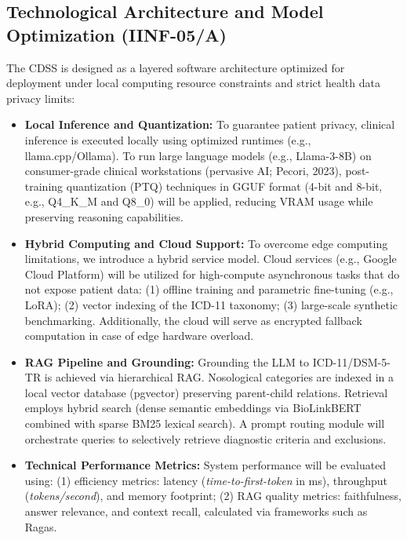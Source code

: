 \documentclass[11pt,a4paper]{article}
\begin{document}
\subsection{Technological Architecture and Model Optimization (IINF-05/A)}
The CDSS is designed as a layered software architecture optimized for deployment under local computing resource constraints and strict health data privacy limits:
\begin{itemize}
    \item \textbf{Local Inference and Quantization:} To guarantee patient privacy, clinical inference is executed locally using optimized runtimes (e.g., llama.cpp/Ollama). To run large language models (e.g., Llama-3-8B) on consumer-grade clinical workstations (pervasive AI; Pecori, 2023), post-training quantization (PTQ) techniques in GGUF format (4-bit and 8-bit, e.g., Q4\_K\_M and Q8\_0) will be applied, reducing VRAM usage while preserving reasoning capabilities.
    \item \textbf{Hybrid Computing and Cloud Support:} To overcome edge computing limitations, we introduce a hybrid service model. Cloud services (e.g., Google Cloud Platform) will be utilized for high-compute asynchronous tasks that do not expose patient data: (1) offline training and parametric fine-tuning (e.g., LoRA); (2) vector indexing of the ICD-11 taxonomy; (3) large-scale synthetic benchmarking. Additionally, the cloud will serve as encrypted fallback computation in case of edge hardware overload.
    \item \textbf{RAG Pipeline and Grounding:} Grounding the LLM to ICD-11/DSM-5-TR is achieved via hierarchical RAG. Nosological categories are indexed in a local vector database (pgvector) preserving parent-child relations. Retrieval employs hybrid search (dense semantic embeddings via BioLinkBERT combined with sparse BM25 lexical search). A prompt routing module will orchestrate queries to selectively retrieve diagnostic criteria and exclusions.
    \item \textbf{Technical Performance Metrics:} System performance will be evaluated using: (1) efficiency metrics: latency (\textit{time-to-first-token} in ms), throughput (\textit{tokens/second}), and memory footprint; (2) RAG quality metrics: faithfulness, answer relevance, and context recall, calculated via frameworks such as Ragas.
\end{itemize}
\end{document}
